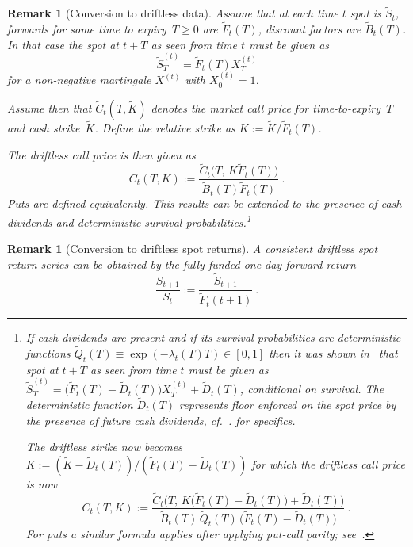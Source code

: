 \documentclass[11pt,a4paper]{article}
\newtheorem{remark}[definition]{Remark}
\DeclareRobustCommand{\eqlabel}[1]{\label{eq:#1}}                                     %
\DeclareRobustCommand{\eq}[1]{\begin{equation}\eqlabel{#1}}                           %
\DeclareRobustCommand{\eqend}{\end{equation}}                                         %
\begin{document}
\begin{remark}[Conversion to driftless data]\label{rem:driftless}
  Assume that at each time $t$ spot is $\tilde S_t$, forwards for some time to expiry~$T\geq 0$ are $\tilde F_t(T)$, discount factors are $\tilde B_t(T)$.
  In  that case the spot at $t+T$ as seen from time $t$ must be given as
  $$
  \tilde S_T^{(t)}= \tilde F_t(T)X_T^{(t)} 
  $$
  for a non-negative martingale $X^{(t)}$ with $X^{(t)}_0=1$. 

  Assume then that $\tilde C_t( T,\tilde{K})$ denotes the market call price for time-to-expiry~$T$ and cash strike~$\tilde K$. 
  Define the relative strike as
  $
  K :=\tilde K / \tilde F_t(  T) 
  $.

  The driftless call price is then given as
  $$
    C_t( T,K) := \frac{\tilde{C}_t\Big( T,\, K \tilde F_t(T) \Big)}{\tilde B_t(T) \tilde F_t(T) } \ .
  $$ 
  Puts are defined equivalently.
  This results can  be extended to the presence of cash dividends and deterministic survival probabilities.\footnote{
    If cash dividends 
    are present and if its survival probabilities are deterministic functions $\tilde Q_t(T)\equiv \exp( - \lambda_t(T)T )\in [0,1]$ then it was shown in~\citet{BuehlerVolAndDivs}
    that spot at $t+T$ as seen from time $t$ must be given as $\tilde S_T^{(t)}=\big(\tilde F_t(T)-\tilde D_t(T)\big) X_T^{(t)} + \tilde D_t(T)$, conditional on survival.
    The deterministic function $\tilde D_t(T)$ represents floor enforced on the spot price by the presence of future cash dividends, cf.~\citet{BuehlerVolAndDivs}.
    for specifics.

    The driftless strike now becomes 
    $
    K := (\tilde K - \tilde D_t( T) ) / ( \tilde F_t(  T) - \tilde D_t(T) )
    $
    for which the driftless call price is now
    $$
      C_t( T,K) := \frac{\tilde{C}_t\Big( T,\, K\big(\tilde F_t(T)-\tilde D_t(T)\big) + \tilde D_t(T)\Big)}{\tilde B_t(T) \, \tilde Q_t(T)\,\big(\tilde F_t(T)-\tilde D_t(T)\big)} \ .
    $$
    For puts a similar formula applies after applying put-call parity; see~\citet{BuehlerVolAndDivs}.}
\end{remark}

\begin{remark}[Conversion to driftless spot returns]\label{rem:driftlessspot}
  A consistent driftless spot return series can be obtained by the fully funded one-day forward-return
  \eq{driftlessspotret}
    \frac{ S_{t+1} }{ S_t } := \frac{\tilde S_{t+1}}{\tilde F_t(t+1)}  \ .
  \eqend
\end{remark}
\end{document}
